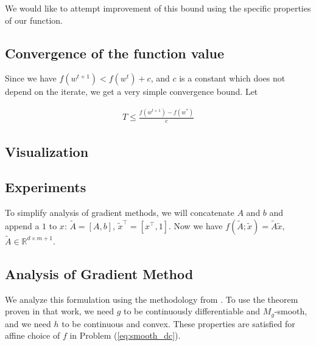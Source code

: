 \documentclass[11pt]{article}
\begin{document}
We would like to attempt improvement of this bound using the specific properties of our function.

\subsection{Convergence of the function value}

Since we have $f(w^{t+1}) < f(w^t) + c$, and $c$ is a constant which does not depend on the iterate, we get a very simple convergence bound. Let

\begin{align*}
    T \leq \frac{f(w^{t+1}) - f(w^*)}{c}
\end{align*}

\subsection{Visualization}

\subsection{Experiments}




To simplify analysis of gradient methods, we will concatenate $A$ and $b$ and append a $1$ to $x$: $\tilde{A} = [A, b]$, $\tilde{x}^\top = [x^\top, 1]$. Now we have $f(\tilde{A}; \tilde{x}) = \tilde{A} \tilde{x}$, $\tilde{A} \in \mathbb{R}^{d \times m+1}$.

\subsection{Analysis of Gradient Method}

We analyze this formulation using the methodology from \cite{khamaru_convergence_2018}. To use the theorem proven in that work, we need $g$ to be continuously differentiable and $M_g$-smooth, and we need $h$ to be continuous and convex. These properties are satisfied for affine choice of $f$ in Problem (\ref{eq:smooth_dc}).
\end{document}
